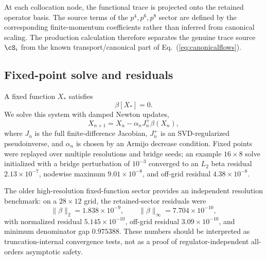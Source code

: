 \documentclass[12pt]{iopart}
\begin{document}
At each collocation node, the functional trace is projected onto the retained operator basis.  The source terms of the $p^4,p^6,p^8$ sector are defined by the corresponding finite-momentum coefficients rather than inferred from canonical scaling.  The production calculation therefore separates the genuine trace source $\cS_i$ from the known transport/canonical part of Eq.~(\ref{eq:canonicalflows}).

\subsection{Fixed-point solve and residuals}

A fixed function $X_*$ satisfies
\begin{equation}
\beta[X_*]=0.
\end{equation}
We solve this system with damped Newton updates,
\begin{equation}
X_{n+1}=X_n-\alpha_n J_n^+\beta(X_n),
\end{equation}
where $J_n$ is the full finite-difference Jacobian, $J_n^+$ is an SVD-regularized pseudoinverse, and $\alpha_n$ is chosen by an Armijo decrease condition.  Fixed points were replayed over multiple resolutions and bridge seeds; an example $16\times8$ solve initialized with a bridge perturbation of $10^{-3}$ converged to an $L_2$ beta residual $2.13\times10^{-7}$, nodewise maximum $9.01\times10^{-8}$, and off-grid residual $4.38\times10^{-8}$.

The older high-resolution fixed-function sector provides an independent resolution benchmark: on a $28\times12$ grid, the retained-sector residuals were
\begin{equation}
\|\beta\|_2=1.838\times10^{-9},\qquad
\|\beta\|_\infty=7.704\times10^{-10},
\end{equation}
with normalized residual $5.145\times10^{-10}$, off-grid residual $3.09\times10^{-10}$, and minimum denominator gap $0.975388$.  These numbers should be interpreted as truncation-internal convergence tests, not as a proof of regulator-independent all-orders asymptotic safety.
\end{document}
